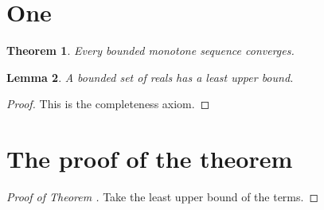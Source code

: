 \documentclass{article}
\newtheorem{theorem}{Theorem}[section]
\newtheorem{lemma}[theorem]{Lemma}
\begin{document}
\section{One}

\begin{theorem}\label{t:main}
Every bounded monotone sequence converges.
\end{theorem}

\begin{lemma}\label{l:sup}
A bounded set of reals has a least upper bound.
\end{lemma}

\begin{proof}
This is the completeness axiom.
\end{proof}

\section{The proof of the theorem}

\begin{proof}[Proof of Theorem ]
Take the least upper bound of the terms.
\end{proof}
\end{document}
